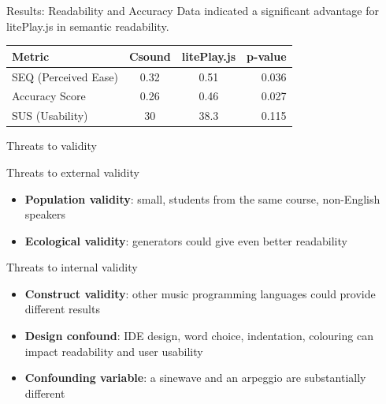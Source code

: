 \documentclass[10pt]{beamer}
\begin{document}
\begin{frame}{Results: Readability and Accuracy}
    Data indicated a significant advantage for litePlay.js in semantic readability.
    \begin{table}
        \centering
        \begin{tabular}{|l|c|c|r|}
        \hline
        \textbf{Metric} & \textbf{Csound} & \textbf{litePlay.js} & \textbf{p-value} \\
        \hline
        SEQ (Perceived Ease) & 0.32 & 0.51 & 0.036 \\
        \hline
        Accuracy Score & 0.26 & 0.46 & 0.027 \\
        \hline
	SUS (Usability) & 30 & 38.3 & 0.115 \\
        \hline
        \end{tabular}
    \end{table}
\end{frame}

\begin{frame}{Threats to validity}
\begin{block}{Threats to external validity}
        \begin{itemize}
	    \item \textbf{Population validity}: small, students from the same course, non-English speakers
            \item \textbf{Ecological validity}: generators could give even better readability
        \end{itemize}
    \end{block}
    \begin{block}{Threats to internal validity}
        \begin{itemize}
	    \item \textbf{Construct validity}: other music programming
		    languages could provide different results
	    \item \textbf{Design confound}: IDE design, word choice,
		    indentation, colouring can impact readability and user
			usability
	    \item \textbf{Confounding variable}: a sinewave and an arpeggio are
		    substantially different
        \end{itemize}
    \end{block}
\end{frame}
\end{document}
